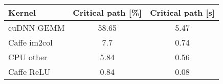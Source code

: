 \begin{table}[]
\centering

\begin{tabular}{lcc}
\toprule
Kernel      & \multicolumn{1}{l}{Critical path {[}\%{]}} & \multicolumn{1}{l}{Critical path {[}s{]}} \\
\midrule
cuDNN GEMM         & 58.65                                      & 5.47                                      \\
Caffe im2col & 7.7                                        & 0.74                                      \\
CPU other    & 5.84                                       & 0.56                                      \\
Caffe ReLU   & 0.84                                       & 0.08    \\
\bottomrule
\end{tabular}

\end{table}